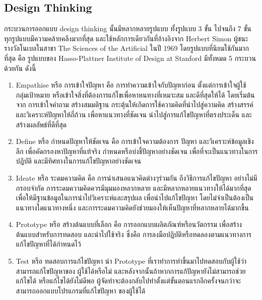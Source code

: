 \subsection{Design Thinking}
กระบวนการออกแบบ design thinking นั้นมีหลากหลายรูปแบบ ทั้งรูปแบบ 3 ขั้น ไปจนถึง 7 ขั้น ทุกรูปแบบมีความคล้ายคลึงมากที่สุด และใช้หลักการเดียวกันที่อ้างอิงจาก Herbert Simon ผู้ชนะรางวัลโนเบลในสาขา The Sciences of the Artificial ในปี 1969 โดยรูปแบบที่นิยมใช้กันมากที่สุด คือ รูปแบบของ Hasso-Plattner Institute of Design at Stanford มีทั้งหมด 5 กระบวนด้วยกัน ดังนี้
\begin{enumerate}
    \item Empathise หรือ การเข้าใจปัญหา
          คือ การทำความเข้าใจกับปัญหาก่อน ตั้งแต่การเข้าใจผู้ใช้ กลุ่มเป้าหมาย หรือเข้าใจสิ่งที่ต้องการแก้ไขเพื่อหาหนทางที่เหมาะสม และดีที่สุดให้ได้ โดยเริ่มต้นจาก การเข้าใจคำถาม สร้างสมมติฐาน กระตุ้นให้เกิดการใช้ความคิดที่นำไปสู่ความคิด สร้างสรรค์ และวิเคราะห์ปัญหาให้ถี่ถ้วน เพื่อหาแนวทางที่ชัดเจน นำไปสู่การแก้ไขปัญหาที่ตรงประเด็น และสร้างผลลัพธ์ที่ดีที่สุด
    \item Define หรือ กำหนดปัญหาให้ชัดเจน
          คือ การเข้าใจความต้องการ ปัญหา และวิเคราะห์ข้อมูลเชิงลึก เพื่อคัดกรองหาปัญหาที่แท้จริง กำหนดหรือบ่งชี้ปัญหาอย่างชัดเจน เพื่อที่จะเป็นแนวทางในการปฎิบัติ และมีทิศทางในการแก้ไขปัญหาอย่างชัดเจน
    \item Ideate หรือ ระดมความคิด
          คือ การนำเสนอแนวคิดต่างๆร่วมกัน ถึงวิธีการแก้ไขปัญหา อย่างไม่มีกรอบจำกัด การระดมความคิดควรมีมุมมองหลากหลาย และมีหลากหลายแนวทางให้ได้มากที่สุด เพื่อให้มีฐานข้อมูลในการนำไปวิเคราะห์และสรุปผล เพื่อนำไปแก้ไขปัญหา โดยไม่จำเป็นต้องเป็นแนวทางใดแนวทางหนึ่ง และการระดมความคิดยังช่วยมองให้เห็นปัญหาที่หลากหลายได้มากขึ้น
    \item Prototype หรือ สร้างต้นแบบที่เลือก
          คือ การออกแบบผลิตภัณฑ์หรือนวัตกรรม เพื่อสร้างต้นแบบสำหรับการทดสอบ และนำไปใช้จริง ซึ่งคือ การลงมือปฎิบัติหรือทดลองตามแนวทางการแก้ไขปัญหาที่ได้กำหนดไว้
    \item Test หรือ ทดสอบการแก้ไขปัญหา นํา Prototype ที่เราทําการทําขึ้นมาไปทดสอบกับผู้ใช้ว่าสามารถแก้ไขปัญหาของ
          ผู้ใช้ได้หรือไม่ และหลังจากนั้นถ้าหากการแก้ปัญหายังไม่สามารถช่วยแก้ไขได้
          หรือแก้ไขได้ยังไม่ดีพอ ผู้จัดทําจะต้องกลับไปทําตั้งแต่ขั้นตอนแรกอีกครั้งจนกว่าจะสามารถออกแบบโปรแกรมที่แก้ไขปัญหา
          ของผู้ใช้ได้



\end{enumerate}
